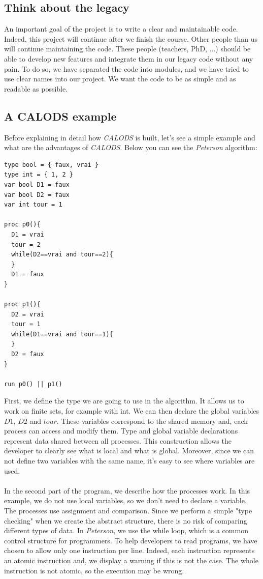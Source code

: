 \documentclass{article}
\begin{document}
\subsection{Think about the legacy}
An important goal of the project is to write a clear and maintainable code. Indeed, this project will continue after we finish the course. Other people than us will continue maintaining the code. These people (teachers, PhD, ...) should be able to develop new features and integrate them in our legacy code without any pain. To do so, we have separated the code into modules, and we have tried to use clear names into our project. We want the code to be as simple and as readable as possible.



\subsection{A CALODS example}
Before explaining in detail how \textit{CALODS} is built, let's see a simple example and what are the advantages of \textit{CALODS}. Below you can see the \textit{Peterson} algorithm:
\begin{lstlisting}
type bool = { faux, vrai }
type int = { 1, 2 }
var bool D1 = faux
var bool D2 = faux
var int tour = 1

proc p0(){
  D1 = vrai
  tour = 2
  while(D2==vrai and tour==2){
  }
  D1 = faux
}

proc p1(){
  D2 = vrai
  tour = 1
  while(D1==vrai and tour==1){
  }
  D2 = faux
}

run p0() || p1()
\end{lstlisting}
First, we define the type we are going to use in the algorithm. It allows us to work on finite sets, for example with int. We can then declare the global variables $D1$, $D2$ and $tour$. These variables correspond to the shared memory and, each process can access and modify them. Type and global variable declarations represent data shared between all processes. This construction allows the developer to clearly see what is local and what is global. Moreover, since we can not define two variables with the same name, it's easy to see where variables are used. \\ \\
In the second part of the program, we describe how the processes work. In this example, we do not use local variables, so we don't need to declare a variable. The processes use assignment and comparison. Since we perform a simple "type checking" when we create the abstract structure, there is no risk of comparing different types of data. In \textit{Peterson}, we use the while loop, which is a common control structure for programmers. To help developers to read programs, we have chosen to allow only one instruction per line. Indeed, each instruction represents an atomic instruction and, we display a warning if this is not the case. The whole instruction is not atomic, so the execution may be wrong.\\ \\
\end{document}
